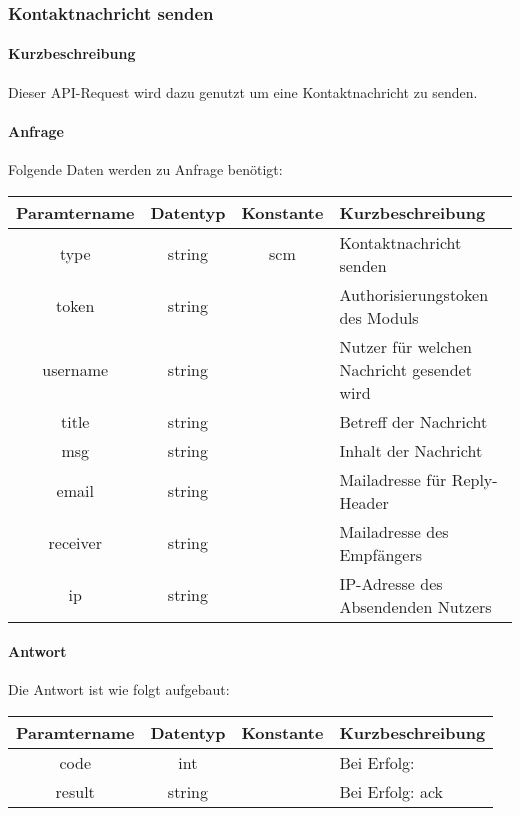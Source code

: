\subsubsection{Kontaktnachricht senden}
\paragraph{Kurzbeschreibung}Dieser API-Request wird dazu genutzt um eine Kontaktnachricht zu senden.
\paragraph{Anfrage}Folgende Daten werden zu Anfrage benötigt:
\begin{table}[H]
	\begin{tabular}{|c|c|c|p{6.5cm}|}
		\hline
		\textbf{Paramtername} & \textbf{Datentyp} & \textbf{Konstante} & \textbf{Kurzbeschreibung}                                                                                               \\ \hline
		type                & string            & scm                & Kontaktnachricht senden \\ \hline
		token               & string            &                    & Authorisierungstoken des Moduls \\ \hline
		username            & string            &                    & Nutzer für welchen Nachricht gesendet wird \\ \hline
		title               & string            &                    & Betreff der Nachricht \\ \hline
		msg                 & string            &                    & Inhalt der Nachricht \\ \hline
		email               & string            &                    & Mailadresse für Reply-Header \\ \hline
		receiver            & string            &                    & Mailadresse des Empfängers \\ \hline
		ip					& string			&					 & IP-Adresse des Absendenden Nutzers \\ \hline
	\end{tabular}
\end{table}
\paragraph{Antwort}Die Antwort ist wie folgt aufgebaut:
\begin{table}[H]
	\begin{tabular}{|c|c|c|p{6.5cm}|}
		\hline
		\textbf{Paramtername} & \textbf{Datentyp} & \textbf{Konstante} & \textbf{Kurzbeschreibung}            \\ \hline                
		code                & int              &                 & Bei Erfolg: {\glqq 0\grqq} \\ \hline
		result              & string           &                 & Bei Erfolg: {\glqq ack\grqq} \\ \hline
	\end{tabular}
\end{table}
